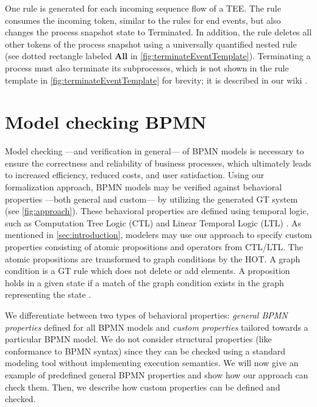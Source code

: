 \documentclass{lmcs} %
\begin{document}
One rule is generated for each incoming sequence flow of a TEE.
The rule consumes the incoming token, similar to the rules for end events, but also changes the process snapshot state to \textsf{Terminated}.
In addition, the rule deletes all other tokens of the process snapshot using a universally quantified nested rule (see dotted rectangle labeled \textbf{All} in \autoref{fig:terminateEventTemplate}).
Terminating a process must also terminate its subprocesses, which is not shown in the rule template in \autoref{fig:terminateEventTemplate} for brevity; it is described in our wiki \cite{timkrauterLMCS2024Artifacts2023}.

\section{Model checking BPMN} \label{sec:modelChecking}

Model checking ---and verification in general--- of BPMN models is necessary to ensure the correctness and reliability of business processes, which ultimately leads to increased efficiency, reduced costs, and user satisfaction.
Using our formalization approach, BPMN models may be verified against behavioral properties ---both general and custom--- by utilizing the generated GT system (see \autoref{fig:approach}).
These behavioral properties are defined using temporal logic, such as Computation Tree Logic (CTL) and Linear Temporal Logic (LTL) \cite{baierPrinciplesModelChecking2008,clarkeHandbookModelChecking2018}.
As mentioned in \autoref{sec:introduction}, modelers may use our approach to specify custom properties consisting of atomic propositions and operators from CTL/LTL.
The atomic propositions are transformed to graph conditions by the HOT.
A graph condition is a GT rule which does not delete or add elements.
A proposition holds in a given state if a match of the graph condition exists in the graph representing the state \cite{kastenbergModelCheckingDynamic2006}.

We differentiate between two types of behavioral properties: \textit{general BPMN properties} defined for all BPMN models and \textit{custom properties} tailored towards a particular BPMN model.
We do not consider structural properties (like conformance to BPMN syntax) since they can be checked using a standard modeling tool without implementing execution semantics.
We will now give an example of predefined general BPMN properties and show how our approach can check them.
Then, we describe how custom properties can be defined and checked.
\end{document}
